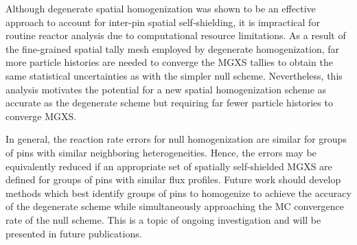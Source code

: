 Although degenerate spatial homogenization was shown to be an effective approach to account for inter-pin spatial self-shielding, it is impractical for routine reactor analysis due to computational resource limitations. As a result of the fine-grained spatial tally mesh employed by degenerate homogenization, far more particle histories are needed to converge the MGXS tallies to obtain the same statistical uncertainties as with the simpler null scheme. Nevertheless, this analysis motivates the potential for a new spatial homogenization scheme as accurate as the degenerate scheme but requiring far fewer particle histories to converge MGXS.

In general, the reaction rate errors for null homogenization are similar for groups of pins with similar neighboring heterogeneities. Hence, the errors may be equivalently reduced if an appropriate set of spatially self-shielded MGXS are defined for groups of pins with similar flux profiles. Future work should develop methods which best identify groups of pins to homogenize to achieve the accuracy of the degenerate scheme while simultaneously approaching the MC convergence rate of the null scheme. This is a topic of ongoing investigation and will be presented in future publications.